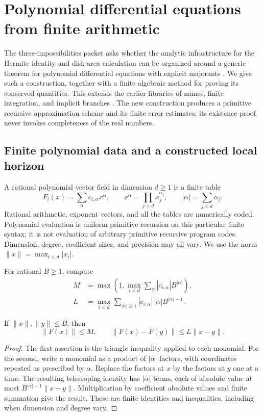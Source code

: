 \section{Polynomial differential equations from finite arithmetic}
\label{sec:ode}

The three-impossibilities packet asks whether the analytic infrastructure
for the Hermite identity and disk-area calculation can be organized around
a generic theorem for polynomial differential equations with explicit
majorants \cite{impossibilitiespacket}.  We give such a construction, together
with a finite algebraic method for proving its conserved quantities.  This
extends the earlier libraries of names, finite integration, and implicit
branches \cite{oldframework}.  The new construction produces a primitive
recursive approximation scheme and its finite error estimates; its
existence proof never invokes completeness of the real numbers.

\subsection{Finite polynomial data and a constructed local horizon}

A rational polynomial vector field in dimension $d\ge1$ is a finite table
\[
 F_i(x)=\sum_{\alpha}c_{i,\alpha}x^\alpha,
 \qquad x^\alpha=\prod_{j<d}x_j^{\alpha_j},\qquad
 |\alpha|=\sum_{j<d}\alpha_j.
\]
Rational arithmetic, exponent vectors, and all the tables are numerically
coded.  Polynomial evaluation is uniform primitive recursion on this
particular finite syntax; it is not evaluation of arbitrary primitive
recursive program codes.  Dimension, degree, coefficient sizes, and
precision may all vary.  We use the norm
$\lVert x\rVert=\max_{i<d}|x_i|$.

For rational $B\ge1$, compute
\begin{align}
 M&=\max\left(1,\max_{i<d}\sum_\alpha
                  |c_{i,\alpha}|B^{|\alpha|}\right),\label{eq:ode-M}\\
 L&=\max_{i<d}\sum_{|\alpha|\ge1}
                  |c_{i,\alpha}|\,|\alpha|B^{|\alpha|-1}.
                  \label{eq:ode-L}
\end{align}

\begin{lemma}
\label{lem:ode-polybound}
If $\lVert x\rVert,\lVert y\rVert\le B$, then
\[
 \lVert F(x)\rVert\le M,\qquad
 \lVert F(x)-F(y)\rVert\le L\lVert x-y\rVert.
\]
\end{lemma}
\begin{proof}
The first assertion is the triangle inequality applied to each monomial.
For the second, write a monomial as a product of $|\alpha|$ factors, with
coordinates repeated as prescribed by $\alpha$.  Replace the factors at
$x$ by the factors at $y$ one at a time.  The resulting telescoping identity
has $|\alpha|$ terms, each of absolute value at most
$B^{|\alpha|-1}\lVert x-y\rVert$.  Multiplication by coefficient absolute
values and finite summation give the result.  These are finite identities
and inequalities, including when dimension and degree vary.
\end{proof}

